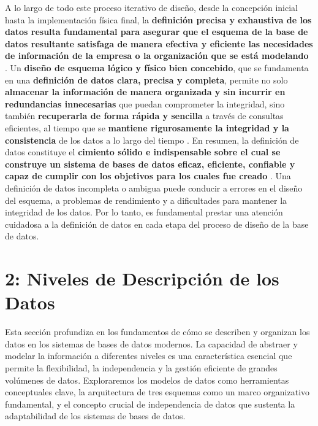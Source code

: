 A lo largo de todo este proceso iterativo de diseño, desde la concepción inicial hasta la implementación física final, la \textbf{definición precisa y exhaustiva de los datos resulta fundamental para asegurar que el esquema de la base de datos resultante satisfaga de manera efectiva y eficiente las necesidades de información de la empresa o la organización que se está modelando} \cite{Fundamentos-de-Sistemas-de-Bases-de-Datos.pdf:59, 61}. Un \textbf{diseño de esquema lógico y físico bien concebido}, que se fundamenta en una \textbf{definición de datos clara, precisa y completa}, permite no solo \textbf{almacenar la información de manera organizada y sin incurrir en redundancias innecesarias} que puedan comprometer la integridad, sino también \textbf{recuperarla de forma rápida y sencilla} a través de consultas eficientes, al tiempo que se \textbf{mantiene rigurosamente la integridad y la consistencia} de los datos a lo largo del tiempo \cite{Fundamentos-de-Sistemas-de-Bases-de-Datos.pdf:59, 61, FBD_1.pdf:1, 12, 13, 22, 24, 25, 26, 27}. En resumen, la definición de datos constituye el \textbf{cimiento sólido e indispensable sobre el cual se construye un sistema de bases de datos eficaz, eficiente, confiable y capaz de cumplir con los objetivos para los cuales fue creado} \cite{Fundamentos-de-Sistemas-de-Bases-de-Datos.pdf:59, 61, FBD_1.pdf:1}. Una definición de datos incompleta o ambigua puede conducir a errores en el diseño del esquema, a problemas de rendimiento y a dificultades para mantener la integridad de los datos. Por lo tanto, es fundamental prestar una atención cuidadosa a la definición de datos en cada etapa del proceso de diseño de la base de datos.

\chapter{2: Niveles de Descripción de los Datos}

Esta sección profundiza en los fundamentos de cómo se describen y organizan los datos en los sistemas de bases de datos modernos. La capacidad de abstraer y modelar la información a diferentes niveles es una característica esencial que permite la flexibilidad, la independencia y la gestión eficiente de grandes volúmenes de datos. Exploraremos los modelos de datos como herramientas conceptuales clave, la arquitectura de tres esquemas como un marco organizativo fundamental, y el concepto crucial de independencia de datos que sustenta la adaptabilidad de los sistemas de bases de datos.

